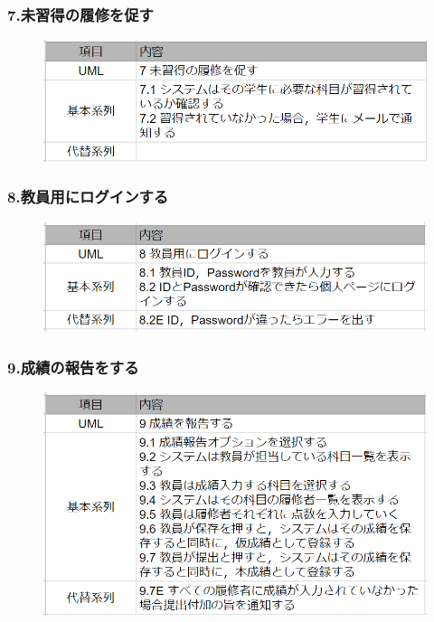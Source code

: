 \documentclass[documentclass]{jsarticle}
\begin{document}
\subsubsection*{7.未習得の履修を促す}
\begin{figure}[H]
  \includegraphics*[scale=0.4]{figure/4-7.png}
\end{figure}

\subsubsection*{8.教員用にログインする}
\begin{figure}[H]
  \includegraphics*[scale=0.4]{figure/4-8.png}
\end{figure}

\subsubsection*{9.成績の報告をする}
\begin{figure}[H]
  \includegraphics*[scale=0.4]{figure/4-9.png}
\end{figure}
\end{document}
